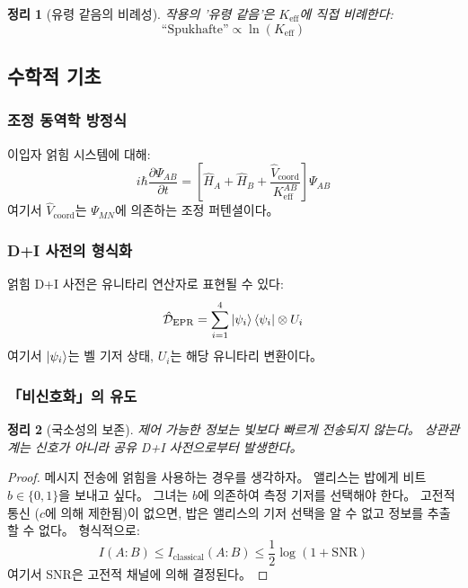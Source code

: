 \documentclass[11pt,a4paper]{article}
\newtheorem{theorem}{정리}
\begin{document}
\begin{theorem}[유령 같음의 비례성]
작용의 '유령 같음'은 $K_{\mathrm{eff}}$에 직접 비례한다:
\begin{equation}
	\text{``Spukhafte''} \propto \ln(K_{\mathrm{eff}})
\end{equation}
\end{theorem}

\subsection{수학적 기초}
\label{subsec:math-foundation}

\subsubsection{조정 동역학 방정식}
이입자 얽힘 시스템에 대해:
\begin{equation}
i\hbar \frac{\partial \Psi_{AB}}{\partial t} = \left[ \hat{H}_A + \hat{H}_B + \frac{\hat{V}_{\text{coord}}}{K_{\mathrm{eff}}^{AB}} \right] \Psi_{AB}
\end{equation}
여기서 $\hat{V}_{\text{coord}}$는 $\Psi_{MN}$에 의존하는 조정 퍼텐셜이다。

\subsubsection{D+I 사전의 형식화}
얽힘 D+I 사전은 유니타리 연산자로 표현될 수 있다:
\begin{equation}
\hat{\mathcal{D}}_{\text{EPR}} = \sum_{i=1}^{4} \ket{\psi_i}\bra{\psi_i} \otimes U_i
\end{equation}
여기서 $\ket{\psi_i}$는 벨 기저 상태, $U_i$는 해당 유니타리 변환이다。

\subsubsection{「비신호화」의 유도}
\begin{theorem}[국소성의 보존]
제어 가능한 정보는 빛보다 빠르게 전송되지 않는다。 상관관계는 신호가 아니라 공유 D+I 사전으로부터 발생한다。
\end{theorem}

\begin{proof}
메시지 전송에 얽힘을 사용하는 경우를 생각하자。 앨리스는 밥에게 비트 $b \in \{0,1\}$을 보내고 싶다。 그녀는 $b$에 의존하여 측정 기저를 선택해야 한다。 고전적 통신 ($c$에 의해 제한됨)이 없으면, 밥은 앨리스의 기저 선택을 알 수 없고 정보를 추출할 수 없다。 형식적으로:
\begin{equation}
	I(A:B) \leq I_{\text{classical}}(A:B) \leq \frac{1}{2} \log(1 + \text{SNR})
\end{equation}
여기서 SNR은 고전적 채널에 의해 결정된다。
\end{proof}
\end{document}
